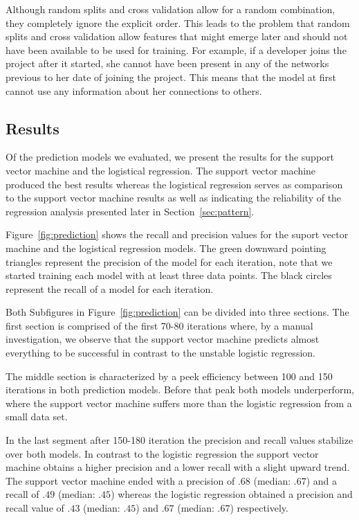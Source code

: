Although random splits and cross validation allow for a random combination, they completely ignore the explicit order.
This leads to the problem that random splits and cross validation allow features that might emerge later and should not have been available to be used for training.
For example, if a developer joins the project after it started, she cannot have been present in any of the networks previous to her date of joining the project.
This means that the model at first cannot use any information about her connections to others.




\subsection{Results}
Of the prediction models we evaluated, we present the results for the support
vector machine and the logistical regression. The support vector machine produced
the best results whereas the logistical regression serves as comparison to the
support vector machine results as well as indicating the reliability of
the regression analysis presented later in Section~\ref{sec:pattern}.

Figure~\ref{fig:prediction} shows the recall and precision values for the
suport vector machine and the logistical regression models. The green downward
pointing triangles represent the precision of the model for each iteration, note that we started training each model with at least three data points. The black circles represent the recall of a model for each
iteration.

Both Subfigures in Figure~\ref{fig:prediction} can be divided into three
sections. The first section is comprised of the first 70-80 iterations where,
by a manual investigation, we observe that the support vector machine predicts almost everything to be successful in contrast to the unstable logistic regression.

The middle section is characterized by a peek efficiency between 100 and 150
iterations in both prediction models. Before that peak both models underperform, where the support vector machine suffers more than the logistic regression from a small data set.

In the last segment after 150-180 iteration the precision and recall values
stabilize over both models. In contrast to the logistic regression the support vector machine obtains a higher precision and a lower recall with a slight upward trend.
The support vector machine ended with a precision of $.68$ (median: $.67$) and a recall of $.49$ (median: $.45$) whereas the logistic regression obtained a precision and recall value of $.43$ (median: $.45$) and $.67$ (median: $.67$) respectively.












